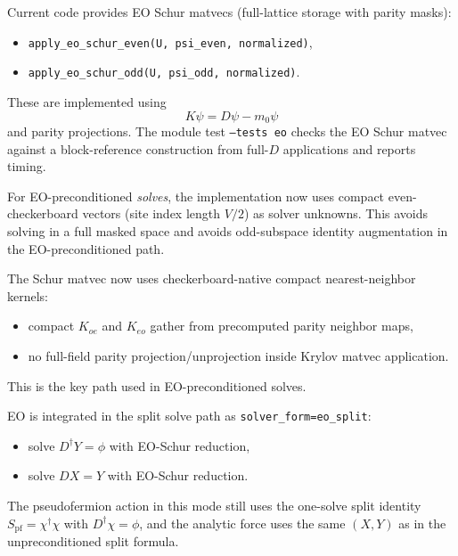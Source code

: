\documentclass[11pt]{article}
\begin{document}
Current code provides EO Schur matvecs (full-lattice storage with parity masks):
\begin{itemize}
  \item \texttt{apply\_eo\_schur\_even(U, psi\_even, normalized)},
  \item \texttt{apply\_eo\_schur\_odd(U, psi\_odd, normalized)}.
\end{itemize}
These are implemented using
\begin{equation}
K\psi = D\psi - m_0\psi
\end{equation}
and parity projections.
The module test \texttt{--tests eo} checks the EO Schur matvec against a block-reference construction from full-$D$ applications and reports timing.

For EO-preconditioned \emph{solves}, the implementation now uses compact even-checkerboard vectors
(site index length $V/2$) as solver unknowns. This avoids solving in a full masked space and avoids odd-subspace identity augmentation in the EO-preconditioned path.

The Schur matvec now uses checkerboard-native compact nearest-neighbor kernels:
\begin{itemize}
  \item compact $K_{oe}$ and $K_{eo}$ gather from precomputed parity neighbor maps,
  \item no full-field parity projection/unprojection inside Krylov matvec application.
\end{itemize}
This is the key path used in EO-preconditioned solves.

EO is integrated in the split solve path as
\texttt{solver\_form=eo\_split}:
\begin{itemize}
  \item solve $D^\dagger Y=\phi$ with EO-Schur reduction,
  \item solve $D X=Y$ with EO-Schur reduction.
\end{itemize}
The pseudofermion action in this mode still uses the one-solve split identity
$S_{\mathrm{pf}}=\chi^\dagger\chi$ with $D^\dagger\chi=\phi$, and the analytic force uses the same $(X,Y)$ as in the unpreconditioned split formula.
\end{document}
